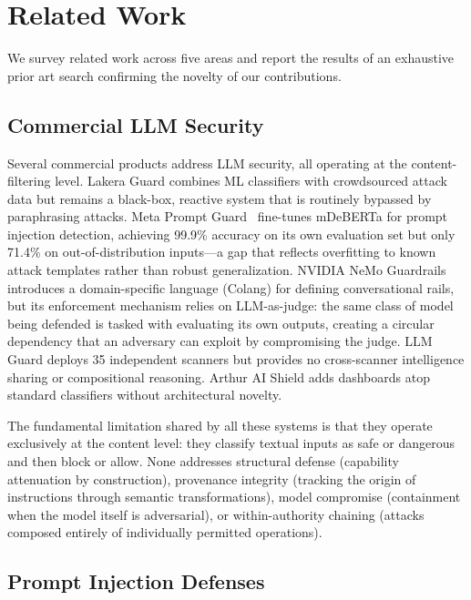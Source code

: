 \section{Related Work}
\label{sec:related}

We survey related work across five areas and report the results of an exhaustive prior art search confirming the novelty of our contributions.

\subsection{Commercial LLM Security}
\label{sec:related:commercial}

Several commercial products address LLM security, all operating at the content-filtering level. Lakera Guard combines ML classifiers with crowdsourced attack data but remains a black-box, reactive system that is routinely bypassed by paraphrasing attacks. Meta Prompt Guard~\cite{promptguard2024} fine-tunes mDeBERTa for prompt injection detection, achieving 99.9\% accuracy on its own evaluation set but only 71.4\% on out-of-distribution inputs---a gap that reflects overfitting to known attack templates rather than robust generalization. NVIDIA NeMo Guardrails~\cite{nemo2023} introduces a domain-specific language (Colang) for defining conversational rails, but its enforcement mechanism relies on LLM-as-judge: the same class of model being defended is tasked with evaluating its own outputs, creating a circular dependency that an adversary can exploit by compromising the judge. LLM Guard deploys 35 independent scanners but provides no cross-scanner intelligence sharing or compositional reasoning. Arthur AI Shield adds dashboards atop standard classifiers without architectural novelty.

The fundamental limitation shared by all these systems is that they operate exclusively at the content level: they classify textual inputs as safe or dangerous and then block or allow. None addresses structural defense (capability attenuation by construction), provenance integrity (tracking the origin of instructions through semantic transformations), model compromise (containment when the model itself is adversarial), or within-authority chaining (attacks composed entirely of individually permitted operations).

\subsection{Prompt Injection Defenses}
\label{sec:related:injection}

